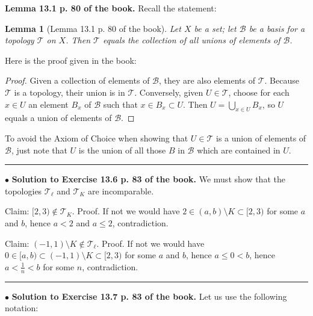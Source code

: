 \documentclass[12pt,letterpaper]{article}
\newtheorem{lem}[thm]{Lemma}
\newcommand{\hs}{\bigskip\hrule\medskip}
\newcommand{\mc}{\mathcal}
\newcommand{\noi}{\noindent}%
\newcommand{\sm}{\setminus}
\begin{document}
\noi\textbf{Lemma 13.1 p. 80 of the book.} Recall the statement: 

\begin{lem}[Lemma 13.1 p. 80 of the book]\label{L13.1}
Let $X$ be a set; let $\mathcal{B}$ be a basis for a topology $\mathcal{T}$ on $X$. Then $\mathcal{T}$ equals the collection of all unions of elements of $\mathcal{B}$.
\end{lem}

Here is the proof given in the book: 

\begin{proof}
Given a collection of elements of $\mathcal{B}$, they are also elements of $\mathcal{T}$. Because $\mathcal{T}$ is a topology, their union is in $\mathcal{T}$. Conversely, given $U \in \mathcal{T}$, choose for each $x\in U$ an element $B_x$ of $\mathcal{B}$ such that $x\in B_x \subset U$. Then $U=\bigcup_{x\in U}B_x$, so $U$ equals a union of elements of $\mathcal{B}$.
\end{proof} 

To avoid the Axiom of Choice when showing that $U \in \mathcal{T}$ is a union of elements of $\mathcal{B}$, just note that $U$ is the union of all those $B$ in $\mc B$ which are contained in  $U$. 


\hs

\noi$\bullet$ \textbf{Solution to Exercise 13.6 p. 83 of the book.} We must show that the topologies $\mc T_\ell$ and $\mc T_K$ are incomparable. 

\noi Claim: $[2,3)\notin\mc T_K$. Proof. If not we would have $2\in(a,b)\sm K\subset[2,3)$ for some $a$ and $b$, hence $a<2$ and $a\le2$, contradiction. 

\noi Claim: $(-1,1)\sm K\notin\mc T_\ell$. Proof. If not we would have $0\in[a,b)\subset(-1,1)\sm K\subset[2,3)$ for some $a$ and $b$, hence $a\le0<b$, hence $a<\frac1n<b$ for some $n$, contradiction. 

\hs

\noi$\bullet$ \textbf{Solution to Exercise 13.7 p. 83 of the book.} Let us use the following notation: 
\end{document}

